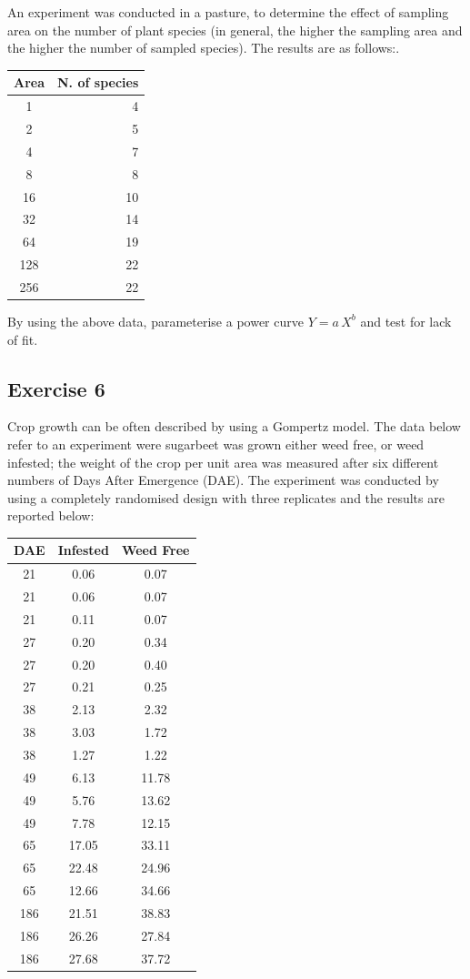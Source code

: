 \documentclass[a4paper,12pt,oneside]{book}
\begin{document}
An experiment was conducted in a pasture, to determine the effect of sampling area on the number of plant species (in general, the higher the sampling area and the higher the number of sampled species). The results are as follows:.

\begin{longtable}[]{@{}cr@{}}
\toprule
Area & N. of species \\
\midrule
\endhead
1 & 4 \\
2 & 5 \\
4 & 7 \\
8 & 8 \\
16 & 10 \\
32 & 14 \\
64 & 19 \\
128 & 22 \\
256 & 22 \\
\bottomrule
\end{longtable}

By using the above data, parameterise a power curve \(Y = a \, X^b\) and test for lack of fit.

\hypertarget{exercise-6-2}{%
\subsection{Exercise 6}\label{exercise-6-2}}

Crop growth can be often described by using a Gompertz model. The data below refer to an experiment were sugarbeet was grown either weed free, or weed infested; the weight of the crop per unit area was measured after six different numbers of Days After Emergence (DAE). The experiment was conducted by using a completely randomised design with three replicates and the results are reported below:

\begin{longtable}[]{@{}ccc@{}}
\toprule
DAE & Infested & Weed Free \\
\midrule
\endhead
21 & 0.06 & 0.07 \\
21 & 0.06 & 0.07 \\
21 & 0.11 & 0.07 \\
27 & 0.20 & 0.34 \\
27 & 0.20 & 0.40 \\
27 & 0.21 & 0.25 \\
38 & 2.13 & 2.32 \\
38 & 3.03 & 1.72 \\
38 & 1.27 & 1.22 \\
49 & 6.13 & 11.78 \\
49 & 5.76 & 13.62 \\
49 & 7.78 & 12.15 \\
65 & 17.05 & 33.11 \\
65 & 22.48 & 24.96 \\
65 & 12.66 & 34.66 \\
186 & 21.51 & 38.83 \\
186 & 26.26 & 27.84 \\
186 & 27.68 & 37.72 \\
\bottomrule
\end{longtable}
\end{document}
